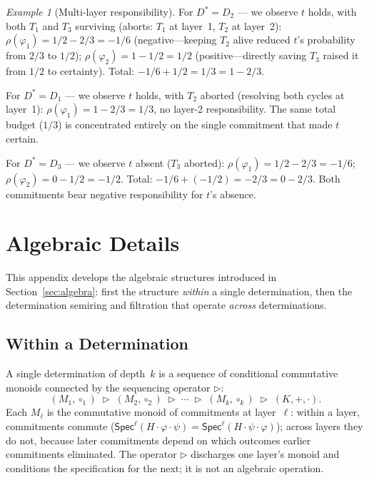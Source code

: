 \documentclass[acmsmall,review,anonymous]{acmart}
\newcommand{\Spec}{\mathsf{Spec}}
\newcommand{\seq}{\mathbin{\triangleright}}
\theoremstyle{remark}
\newtheorem{example}{Example}
\numberwithin{definition}{section}
\numberwithin{theorem}{section}
\numberwithin{lemma}{section}
\numberwithin{corollary}{section}
\numberwithin{remark}{section}
\numberwithin{example}{section}
\numberwithin{observation}{section}
\numberwithin{assumption}{section}
\begin{document}
\begin{example}[Multi-layer responsibility]
  For $D^* = D_2$ --- we observe $t$ holds, with both $T_1$ and $T_3$
  surviving (aborts: $T_1$ at layer~1, $T_2$ at layer~2):
  $\rho(\varphi_1) = 1/2 - 2/3 = -1/6$ (negative---keeping
  $T_2$ alive reduced $t$'s probability from $2/3$ to $1/2$);
  $\rho(\varphi_2) = 1 - 1/2 = 1/2$ (positive---directly
  saving $T_3$ raised it from $1/2$ to certainty).
  Total: $-1/6 + 1/2 = 1/3 = 1 - 2/3$.

  For $D^* = D_1$ --- we observe $t$ holds, with $T_2$ aborted
  (resolving both cycles at layer~1):
  $\rho(\varphi_1) = 1 - 2/3 = 1/3$, no layer-2 responsibility.
  The same total budget ($1/3$) is concentrated entirely on the single
  commitment that made $t$ certain.

  For $D^* = D_3$ --- we observe $t$ absent ($T_3$ aborted):
  $\rho(\varphi_1) = 1/2 - 2/3 = -1/6$;
  $\rho(\varphi_2) = 0 - 1/2 = -1/2$.
  Total: $-1/6 + (-1/2) = -2/3 = 0 - 2/3$.
  Both commitments bear negative responsibility for $t$'s absence.
\end{example}

\section{Algebraic Details}
\label{app:algebra}
\label{app:det-semiring-details}

This appendix develops the algebraic structures introduced in
Section~\ref{sec:algebra}: first the structure \emph{within} a single
determination, then the determination semiring and filtration that
operate \emph{across} determinations.

\subsection{Within a Determination}

A single determination of depth~$k$ is a sequence of conditional
commutative monoids connected by the sequencing operator $\seq$:
\[
  (M_1, \circ_1) \;\seq\; (M_2, \circ_2) \;\seq\; \cdots \;\seq\; (M_k, \circ_k)
  \;\seq\; (K, +, \cdot).
\]
Each $M_\ell$ is the commutative monoid of commitments at layer~$\ell$:
within a layer, commitments commute
($\Spec^{\ell}(H \cdot \varphi \cdot \psi) = \Spec^{\ell}(H \cdot \psi \cdot \varphi)$);
across layers they do not, because later commitments depend on which
outcomes earlier commitments eliminated.
The operator $\seq$ discharges one layer's monoid and conditions the
specification for the next; it is not an algebraic operation.
\end{document}
